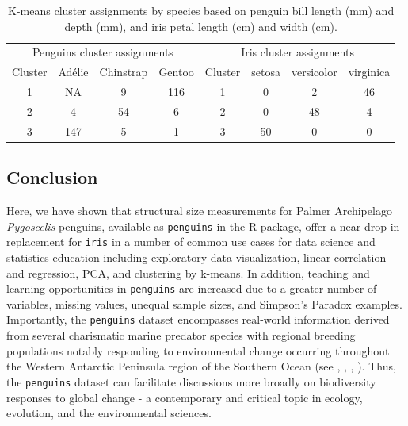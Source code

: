 \begin{Schunk}
\begin{table}

\caption{\label{tab:kmeans-counts}K-means cluster assignments by species based on penguin bill length (mm) and depth (mm), and iris petal length (cm) and width (cm).}
\centering
\begin{tabular}[t]{cccccccc}
\toprule
\multicolumn{4}{c}{Penguins cluster assignments} & \multicolumn{4}{c}{Iris cluster assignments} \\
\cmidrule(l{3pt}r{3pt}){1-4} \cmidrule(l{3pt}r{3pt}){5-8}
Cluster & Adélie & Chinstrap & Gentoo & Cluster & setosa & versicolor & virginica\\
\midrule
1 & NA & 9 & 116 & 1 & 0 & 2 & 46\\
2 & 4 & 54 & 6 & 2 & 0 & 48 & 4\\
3 & 147 & 5 & 1 & 3 & 50 & 0 & 0\\
\bottomrule
\end{tabular}
\end{table}

\end{Schunk}

\hypertarget{conclusion}{%
\subsection{Conclusion}\label{conclusion}}

Here, we have shown that structural size measurements for Palmer
Archipelago \emph{Pygoscelis} penguins, available as \texttt{penguins}
in the  R package, offer a near drop-in
replacement for \texttt{iris} in a number of common use cases for data
science and statistics education including exploratory data
visualization, linear correlation and regression, PCA, and clustering by
k-means. In addition, teaching and learning opportunities in
\texttt{penguins} are increased due to a greater number of variables,
missing values, unequal sample sizes, and Simpson's Paradox examples.
Importantly, the \texttt{penguins} dataset encompasses real-world
information derived from several charismatic marine predator species
with regional breeding populations notably responding to environmental
change occurring throughout the Western Antarctic Peninsula region of
the Southern Ocean (see \citet{bestelmeyer_analysis_2011},
\citet{gorman_ecological_2014}, \citet{gorman_population_2017},
\citet{gorman_advancing_2021}). Thus, the \texttt{penguins} dataset can
facilitate discussions more broadly on biodiversity responses to global
change - a contemporary and critical topic in ecology, evolution, and
the environmental sciences.

